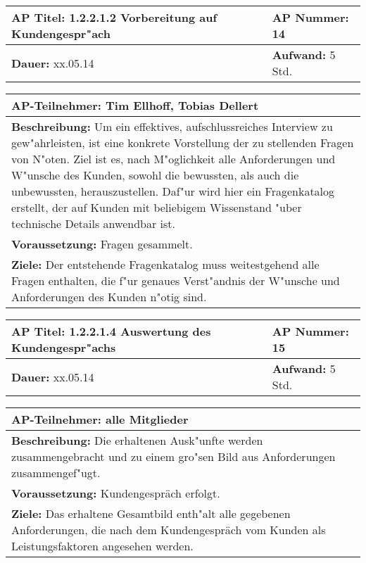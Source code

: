 \begin{tabular}{|p{7.43cm}|p{7.43cm}|}
\hline
\textbf{AP Titel: }1.2.2.1.2 Vorbereitung auf Kundengespr"ach& \textbf{AP Nummer: }14\\ 
\hline
\textbf{Dauer: }xx.05.14& \textbf{Aufwand: } 5 Std.\\
\hline
\end{tabular}
\begin{tabular}{|p{15.3cm}|}
\hline
\textbf{AP-Teilnehmer: }Tim Ellhoff, Tobias Dellert\\
\hline
\textbf{Beschreibung: }Um ein effektives, aufschlussreiches Interview zu gew"ahrleisten, ist eine konkrete Vorstellung der zu stellenden Fragen von N"oten. Ziel ist es, nach M"oglichkeit alle Anforderungen und W"unsche des Kunden, sowohl die bewussten, als auch die unbewussten, herauszustellen. Daf"ur wird hier ein Fragenkatalog erstellt, der auf Kunden mit beliebigem Wissenstand "uber technische Details anwendbar ist.\\
\hline
\textbf{Voraussetzung: }Fragen gesammelt.\\
\hline 
\textbf{Ziele: }Der entstehende Fragenkatalog muss weitestgehend alle Fragen enthalten, die f"ur genaues Verst"andnis der W"unsche und Anforderungen des Kunden n"otig sind.\\
\hline 
\end{tabular}

\begin{tabular}{|p{7.43cm}|p{7.43cm}|}
\hline
\textbf{AP Titel: }1.2.2.1.4 Auswertung des Kundengespr"achs& \textbf{AP Nummer: }15\\ 
\hline
\textbf{Dauer: }xx.05.14& \textbf{Aufwand: } 5 Std.\\
\hline
\end{tabular}
\begin{tabular}{|p{15.3cm}|}
\hline
\textbf{AP-Teilnehmer: }alle Mitglieder\\
\hline
\textbf{Beschreibung: }Die erhaltenen Ausk"unfte werden zusammengebracht und zu einem gro"sen Bild aus Anforderungen zusammengef"ugt.\\
\hline
\textbf{Voraussetzung: }Kundengespräch erfolgt.\\
\hline 
\textbf{Ziele: }Das erhaltene Gesamtbild enth"alt alle gegebenen Anforderungen, die nach dem Kundengespräch vom Kunden als Leistungsfaktoren angesehen werden.\\
\hline 
\end{tabular}

